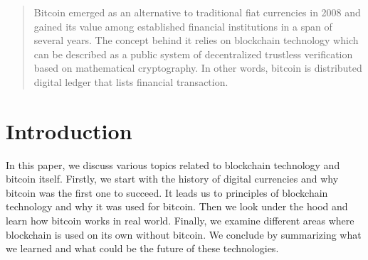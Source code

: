 \documentclass[conference,compsoc]{IEEEtran}
\begin{document}
\maketitle

\begin{abstract}
Bitcoin emerged as an alternative to traditional fiat currencies in 2008 and gained its value among established financial institutions in a span of several years. The concept behind it relies on blockchain technology which can be described as a public system of decentralized trustless verification based on mathematical cryptography. In other words, bitcoin is distributed digital ledger that lists financial transaction. 


\end{abstract}





%
\IEEEpeerreviewmaketitle



\section{Introduction}
In this paper, we discuss various topics related to blockchain technology and bitcoin itself. Firstly, we start with the history of digital currencies and why bitcoin was the first one to succeed. It leads us to principles of blockchain technology and why it was used for bitcoin. Then we look under the hood and learn how bitcoin works in real world. Finally, we examine different areas where blockchain is used on its own without bitcoin. We conclude by summarizing what we learned and what could be the future of these technologies.
\end{document}
